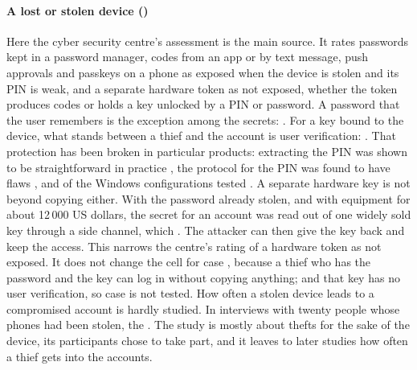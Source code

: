 \paragraph{A lost or stolen device ()}
Here the cyber security centre's assessment is the main source.
It rates passwords kept in a password manager, codes from an app or by
text message, push approvals and passkeys on a phone as exposed when the
device is stolen and its PIN is weak, and a separate hardware token as
not exposed, whether the token produces codes or holds a key unlocked by
a PIN or password.
A password that the user remembers is the exception among the secrets:
.
For a key bound to the device, what stands between a thief and the
account is user verification:
.
That protection has been broken in particular products: extracting the
PIN was shown to be straightforward in practice
\autocite[\abso]{Barbosa2023RogueKey},
the protocol for the PIN was found to have flaws
\autocite{Guan2022FormalFIDO2}, and of the Windows configurations
tested
.
A separate hardware key is not beyond copying either.
With the password already stolen, and with equipment for about 12\,000
US dollars, the secret for an account was read out of one widely sold
key through a side channel, which
.
The attacker can then give the key back and keep the access.
This narrows the centre's rating of a hardware token as not exposed.
It does not change the cell for case , because a thief who
has the password and the key can log in without copying anything; and
that key has no user verification, so case  is not tested.
How often a stolen device leads to a compromised account is hardly
studied.
In interviews with twenty people whose phones had been stolen, the
.
The study is mostly about thefts for the sake of the device, its
participants chose to take part, and it leaves to later studies how
often a thief gets into the accounts.


